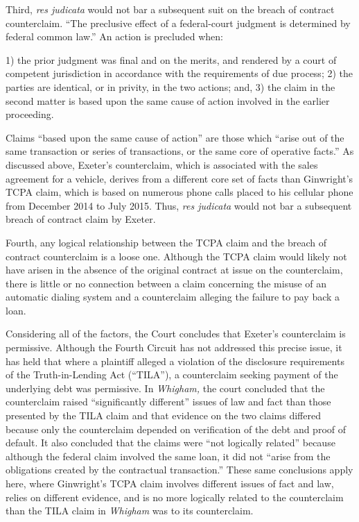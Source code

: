 \documentclass[11pt,letterpaper,twoside]{article}
\renewenvironment{quote}{%
   \list{}{%
     \leftmargin2em   %
     \rightmargin\leftmargin\parsep .1em }
   \item\relax
}
{\endlist}
\begin{document}
Third, \emph{res judicata} would not bar a subsequent suit on the breach
of contract counterclaim.{}
``The preclusive effect of a federal-court judgment is determined by
federal common law.'' An action is precluded when:

\begin{quote}
1) the prior judgment was final and on the merits, and rendered by a
court of competent jurisdiction in accordance with the requirements of
due process; 2) the parties are identical, or in privity, in the two
actions; and, 3) the claim in the second matter is based upon the same
cause of action involved in the earlier proceeding.
\end{quote}

Claims ``based upon the same cause of action'' are those which ``arise
out of the same transaction or series of transactions, or the same core
of operative facts.'' As discussed above, Exeter's counterclaim, which
is associated with the sales agreement for a vehicle, derives from a
different core set of facts than Ginwright's TCPA claim, which is based
on numerous phone calls placed to his cellular phone from December 2014
to July 2015. Thus, \emph{res judicata} would not bar a subsequent
breach of contract claim by Exeter.

Fourth, any logical relationship between the TCPA claim and the breach
of contract counterclaim is a loose one. Although the TCPA claim would
likely not have arisen in the absence of the original contract at issue
on the counterclaim, there is little or no connection between a claim
concerning the misuse of an automatic dialing system and a counterclaim
alleging the failure to pay back a loan.

Considering all of the factors, the Court concludes that Exeter's
counterclaim is permissive. Although the Fourth Circuit has not
addressed this precise issue, it has held that where a plaintiff alleged
a violation of the disclosure requirements of the Truth-in-Lending Act
(``TILA''), a counterclaim seeking payment of the underlying debt was
permissive. In \emph{Whigham,} the court concluded that the counterclaim
raised ``significantly different'' issues of law and fact than those
presented by the TILA claim and that evidence on the two claims differed
because only the counterclaim depended on verification of the debt and
proof of default. It also concluded that the claims were ``not logically
related'' because although the federal claim involved the same loan, it
did not ``arise from the obligations created by the contractual
transaction.'' These same conclusions apply here, where Ginwright's TCPA
claim involves different issues of fact and law, relies on different
evidence, and is no more logically related to the counterclaim than the
TILA claim in \emph{Whigham} was to its counterclaim.
\end{document}
